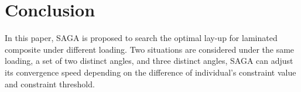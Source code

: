 \section{Conclusion}
In this paper, SAGA is proposed to search the optimal lay-up for laminated composite under different
loading. Two situations are considered under the same loading, a set of two distinct angles, and
three distinct angles, SAGA can adjust its convergence speed depending on the difference of
individual's constraint value and constraint threshold.  



